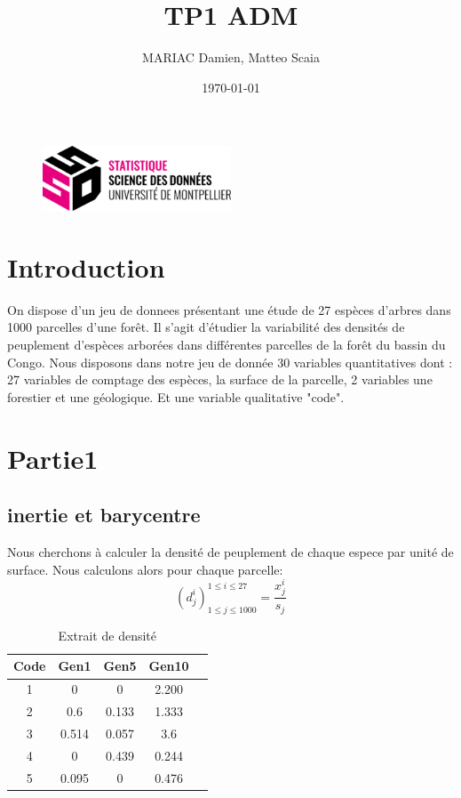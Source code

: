 \documentclass{article}
\title{TP1 ADM}
\author{MARIAC Damien, Matteo Scaia}
\date{\today}
\begin{document}
\maketitle

\begin{figure}[h] 
    \centering
    \includegraphics[width=0.5\textwidth]{ssd_logo.png} 
\end{figure}

\newpage
\tableofcontents
\newpage

\section{Introduction}
On dispose d'un jeu de donnees présentant une étude de 27 espèces d'arbres dans 1000 parcelles d'une forêt.
Il s'agit d'étudier la variabilité des densités de peuplement d'espèces arborées dans différentes parcelles de la forêt du bassin du Congo.
Nous disposons dans notre jeu de donnée 30 variables quantitatives dont : 27 variables de comptage des espèces, la surface de la parcelle, 2 variables une forestier et une géologique.
Et une variable qualitative "code".

\section{Partie1}
\subsection{inertie et barycentre}

Nous cherchons à calculer la densité de peuplement de chaque espece par unité de surface. Nous calculons alors pour chaque parcelle:
\[
(d_j^i)_{1 \leq j \leq 1000}^{1 \leq i \leq 27} = \frac{x_j^i}{s_j}
\]

\begin{table}[h]
    \centering
    \caption{Extrait de densité}
    \label{tab:donnees_extrait}
    \begin{tabular}{|c|c|c|c|c|}
    \hline
    \textbf{Code} & \textbf{Gen1} & \textbf{Gen5} & \textbf{Gen10}\\
    \hline
    1 & 0 & 0 & 2.200 \\
    2 & 0.6 & 0.133 & 1.333  \\
    3 & 0.514 & 0.057 & 3.6 \\
    4 & 0 & 0.439 & 0.244 \\
    5 & 0.095 & 0 & 0.476 \\
    \hline
    \end{tabular}
    \end{table}
\end{document}
